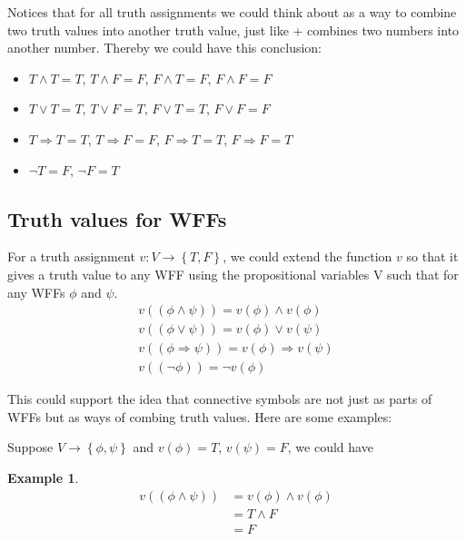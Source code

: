 \documentclass[11pt]{article}
\theoremstyle{definition}
\newtheorem{eg}{Example}[subsection]
\begin{document}
Notices that for all truth assignments we could think about as a way to combine two truth values into another truth value, just like $+$ combines two numbers into another number. Thereby we could have this conclusion:
\begin{itemize}
    \item $T \wedge T = T$, $T \wedge F = F$, $F \wedge T = F$, $F \wedge F = F$
    \item $T \vee T = T$, $T \vee F = T$, $F \vee T = T$, $F \vee F = F$
    \item $T \Rightarrow T = T$, $T \Rightarrow F = F$, $F \Rightarrow T = T$, $F \Rightarrow F = T$
    \item $\neg T = F$, $\neg F = T$
\end{itemize}

\subsection{Truth values for WFFs}
For a truth assignment $v: V \rightarrow \left\{T,F\right\}$, we could extend the function $v$ so that it gives a truth value to any WFF using the propositional variables V such that for any WFFs $\phi$ and $\psi$.
\begin{gather}
    v((\phi \wedge \psi)) = v(\phi) \wedge v(\phi)\\
    v((\phi \vee \psi)) = v(\phi) \vee v(\psi)\\
    v((\phi \Rightarrow \psi)) = v(\phi) \Rightarrow v(\psi)\\
    v((\neg \phi)) = \neg v(\phi)
\end{gather}

This could support the idea that connective symbols are not just as parts of WFFs but as ways of combing truth values. Here are some examples:

Suppose $V \rightarrow \left\{\phi,\psi\right\}$ and $v(\phi)=T$, $v(\psi)=F$, we could have
\begin{eg}
    \begin{equation}
        \begin{split}
            v((\phi \wedge \psi)) &= v(\phi) \wedge v(\phi)\\
                                  &= T \wedge F\\
                                  &= F
        \end{split}
    \end{equation}
\end{eg}
\end{document}
